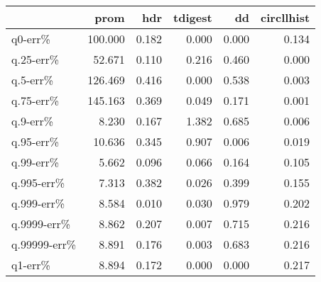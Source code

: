 \begin{tabular}{lrrrrr}
\toprule
{} &    prom &   hdr &  tdigest &    dd &  circllhist \\
\midrule
q0-err\%      & 100.000 & 0.182 &    0.000 & 0.000 &       0.134 \\
q.25-err\%    &  52.671 & 0.110 &    0.216 & 0.460 &       0.000 \\
q.5-err\%     & 126.469 & 0.416 &    0.000 & 0.538 &       0.003 \\
q.75-err\%    & 145.163 & 0.369 &    0.049 & 0.171 &       0.001 \\
q.9-err\%     &   8.230 & 0.167 &    1.382 & 0.685 &       0.006 \\
q.95-err\%    &  10.636 & 0.345 &    0.907 & 0.006 &       0.019 \\
q.99-err\%    &   5.662 & 0.096 &    0.066 & 0.164 &       0.105 \\
q.995-err\%   &   7.313 & 0.382 &    0.026 & 0.399 &       0.155 \\
q.999-err\%   &   8.584 & 0.010 &    0.030 & 0.979 &       0.202 \\
q.9999-err\%  &   8.862 & 0.207 &    0.007 & 0.715 &       0.216 \\
q.99999-err\% &   8.891 & 0.176 &    0.003 & 0.683 &       0.216 \\
q1-err\%      &   8.894 & 0.172 &    0.000 & 0.000 &       0.217 \\
\bottomrule
\end{tabular}
